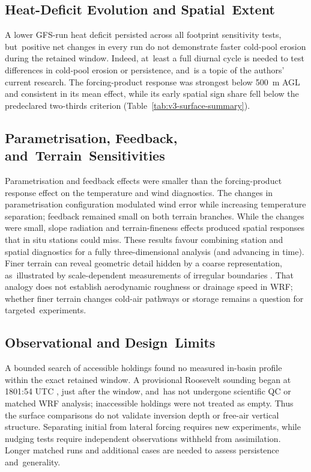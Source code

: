 \documentclass[air,article,accept,moreauthors]{Definitions/mdpi}
\begin{document}
\subsection{Heat-Deficit Evolution and Spatial~Extent}
\label{sec:v3-disc-spatial}

A lower GFS-run heat deficit persisted across all footprint sensitivity tests, but~positive net changes in every run do not demonstrate faster cold-pool erosion during the retained window.
Indeed, at~least a full diurnal cycle is needed to test differences in cold-pool erosion or persistence, and~is a topic of the authors' current research.
The forcing-product response was strongest below 500~m AGL and consistent in its mean effect, while its early spatial sign share fell below the predeclared two-thirds criterion (Table~\ref{tab:v3-surface-summary}).

\subsection{Parametrisation, Feedback, and~Terrain~Sensitivities}
\label{sec:v3-disc-process}

Parametrisation and feedback effects were smaller than the forcing-product response effect on the temperature and wind diagnostics.
The changes in parametrisation configuration modulated wind error while increasing temperature separation; feedback remained small on both terrain branches.
While the changes were small, slope radiation and terrain-fineness effects produced spatial responses that in situ stations could miss.
These results favour combining station and spatial diagnostics for a fully three-dimensional analysis (and advancing in time).
Finer terrain can reveal geometric detail hidden by a coarse representation, as~illustrated by scale-dependent measurements of irregular boundaries \citep{Mandelbrot1967-gq}.
That analogy does not establish aerodynamic roughness or drainage speed in WRF; whether finer terrain changes cold-air pathways or storage remains a question for targeted~experiments.

\subsection{Observational and Design~Limits}
\label{sec:v3-disc-domains}

A bounded search of accessible holdings found no measured in-basin profile within the exact retained window.
A provisional Roosevelt sounding began at 1801:54 UTC \citep{UtahUBOS}, just after the window, and~has not undergone scientific QC or matched WRF analysis; inaccessible holdings were not treated as empty.
Thus the surface comparisons do not validate inversion depth or free-air vertical structure.
Separating initial from lateral forcing requires new experiments, while nudging tests require independent observations withheld from assimilation.
Longer matched runs and additional cases are needed to assess persistence and~generality.
\end{document}

